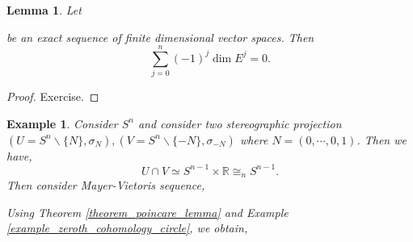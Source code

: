 \documentclass[8pt]{article}
\newtheorem{lemma}{Lemma}[section]
\newtheorem{example}{Example}[section]
\newcommand{\R}[0]{\mathbb{R}}
\begin{document}
\begin{lemma}
  Let 
  \begin{center}
  \end{center}
  be an exact sequence of finite dimensional vector spaces. Then 
  \begin{equation*}
    \sum_{j=0}^n (-1)^j\dim E^j = 0.
  \end{equation*}
\end{lemma}

\begin{proof}
  Exercise.
\end{proof}

\begin{example}
  Consider $S^n$ and consider two stereographic projection $(U=S^n\backslash\{N\},\sigma_N),(V=S^n\backslash\{-N\},\sigma_{-N})$ where $N=(0,\cdots,0,1)$. Then we have,
  \begin{equation*}
    U\cap V\simeq S^{n-1}\times \R\cong_n S^{n-1}.
  \end{equation*}
  Then consider Mayer-Vietoris sequence,
  \begin{center}
  \end{center}
  Using Theorem \ref{theorem_poincare_lemma} and Example \ref{example_zeroth_cohomology_circle}, we obtain,
  \begin{center}
\end{center}
\end{example}
\end{document}
